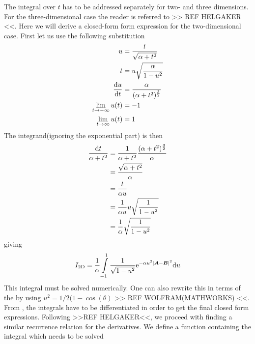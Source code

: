     The integral over $t$ has to be addressed separately for two- and three
    dimensions. For the three-dimensional case the reader is referred to >> REF
    HELGAKER <<. Here we will derive a closed-form form expression for the
    two-dimensional case. First let us use the following substitution
        \begin{equation}
            \begin{aligned}
                u &= \frac{t}{\sqrt{\alpha+t^2}} \\
                t &= u\sqrt{\frac{\alpha}{1-u^2}} \\
                \frac{\mathrm{d} u}{\mathrm{d} t} &= \frac{\alpha}{(\alpha + t^2)^{\frac{3}{2}}} \\
                \lim\limits_{t\rightarrow -\infty} u(t) &= -1 \\
                \lim\limits_{t\rightarrow \infty} u(t) &= 1 \\
            \end{aligned}
        \end{equation}
    The integrand(ignoring the exponential part) is then
        \begin{align}
            \frac{\mathrm{d} t}{\alpha + t^2} &= \frac{1}{\alpha + t^2} \frac{(\alpha +
            t^2)^{\frac{3}{2}}}{\alpha} \nonumber \\
            &= \frac{\sqrt{\alpha + t^2}}{\alpha} \nonumber \\
            &= \frac{t}{\alpha u} \nonumber \\
            &= \frac{1}{\alpha u} u\sqrt{\frac{1}{1-u^2}} \nonumber \\
            &= \frac{1}{\alpha}\sqrt{\frac{1}{1-u^2}}
        \end{align}
    giving
        \begin{align}
            I_{\text{2D}} = \frac{1}{\alpha}\int\limits^1_{-1}
            \frac{1}{\sqrt{1-u^2}} \mathrm{e}^{-\alpha u^2\abs{\boldsymbol{{A}} - \boldsymbol{{B}}}^2}
            \mathrm{d} u
            \label{eq:oneElectron2D}
        \end{align}
    This integral must be solved numerically. One can also rewrite this in
    terms of the  by using
    $u^2=1/2(1 - \cos(\theta)$ >> REF WOLFRAM(MATHWORKS) <<. From
    , the integrals have to be differentiated in order
    to get the final closed form expressions. Following >>REF HELGAKER<<, we
    proceed with finding a similar recurrence relation for the derivatives. We
    define a function containing the integral which needs to be solved
